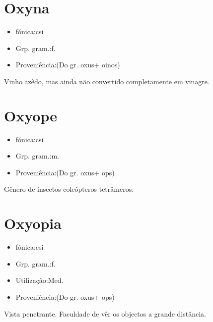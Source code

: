 \section{Oxyna}
\begin{itemize}
\item {fónica:csi}
\end{itemize}
\begin{itemize}
\item {Grp. gram.:f.}
\end{itemize}
\begin{itemize}
\item {Proveniência:(Do gr. \textunderscore oxus\textunderscore  + \textunderscore oinos\textunderscore )}
\end{itemize}
Vinho azêdo, mas ainda não convertido completamente em vinagre.
\section{Oxyope}
\begin{itemize}
\item {fónica:csi}
\end{itemize}
\begin{itemize}
\item {Grp. gram.:m.}
\end{itemize}
\begin{itemize}
\item {Proveniência:(Do gr. \textunderscore oxus\textunderscore  + \textunderscore ops\textunderscore )}
\end{itemize}
Gênero de insectos coleópteros tetrâmeros.
\section{Oxyopia}
\begin{itemize}
\item {fónica:csi}
\end{itemize}
\begin{itemize}
\item {Grp. gram.:f.}
\end{itemize}
\begin{itemize}
\item {Utilização:Med.}
\end{itemize}
\begin{itemize}
\item {Proveniência:(Do gr. \textunderscore oxus\textunderscore  + \textunderscore ops\textunderscore )}
\end{itemize}
Vista penetrante.
Faculdade de vêr os objectos a grande distância.
